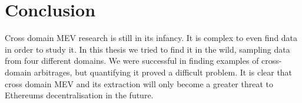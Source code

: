\chapter{Conclusion}
\label{Sec:Conclusion}

Cross domain MEV research is still in its infancy. It is complex to even find data in order to study it. In this thesis we tried to find it in the wild, sampling data from four different domains. We were successful in finding examples of cross-domain arbitrages, but quantifying it proved a difficult problem. It is clear that cross domain MEV and its extraction will only become a greater threat to Ethereums decentralisation in the future.



